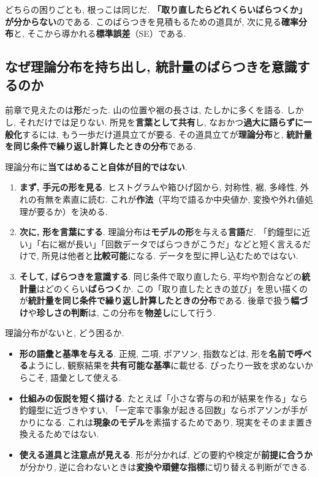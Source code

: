     どちらの困りごとも, 根っこは同じだ.
    \textbf{「取り直したらどれくらいばらつくか」が分からない}のである.
    このばらつきを見積もるための道具が, 次に見る\textbf{確率分布}と, そこから導かれる\textbf{標準誤差}（SE）である.

  \subsection{なぜ理論分布を持ち出し, 統計量のばらつきを意識するのか}
    前章で見えたのは\textbf{形}だった.
    山の位置や裾の長さは, たしかに多くを語る.
    しかし, それだけでは足りない.
    所見を\textbf{言葉として共有}し, なおかつ\textbf{過大に語らずに一般化}するには, もう一歩だけ道具立てが要る.
    その道具立てが\textbf{理論分布}と, \textbf{統計量を同じ条件で繰り返し計算したときの分布}である.

    理論分布に\textbf{当てはめること自体が目的ではない}.
    \begin{enumerate}
      \item \textbf{まず, 手元の形を見る}. ヒストグラムや箱ひげ図から, 対称性, 裾, 多峰性, 外れの有無を素直に読む. これが\textbf{作法}（平均で語るか中央値か, 変換や外れ値処理が要るか）を決める.
      \item \textbf{次に, 形を言葉にする}. 理論分布は\textbf{モデルの形}を与える\textbf{言語}だ.
            「釣鐘型に近い」「右に裾が長い」「回数データでばらつきがこうだ」などと短く言えるだけで, 所見は他者と\textbf{比較可能}になる.
            データを型に押し込むためではない.
      \item \textbf{そして, ばらつきを意識する}. 同じ条件で取り直したら, 平均や割合などの\textbf{統計量}はどのくらい\textbf{ばらつく}か.
            この「取り直したときの並び」を思い描くのが\textbf{統計量を同じ条件で繰り返し計算したときの分布}である.
            後章で扱う\textbf{幅づけ}や\textbf{珍しさの判断}は, この分布を\textbf{物差し}にして行う.
    \end{enumerate}

    理論分布がないと, どう困るか.
    \begin{itemize}
      \item \textbf{形の語彙と基準を与える}. 正規, 二項, ポアソン, 指数などは, 形を\textbf{名前で呼べる}ようにし, 観察結果を\textbf{共有可能な基準}に載せる. ぴったり一致を求めないからこそ, 語彙として使える.
      \item \textbf{仕組みの仮説を短く描ける}. たとえば「小さな寄与の和が結果を作る」なら釣鐘型に近づきやすい, 「一定率で事象が起きる回数」ならポアソンが手がかりになる.
            これは\textbf{現象のモデル}を素描するためであり, 現実をそのまま置き換えるためではない.
      \item \textbf{使える道具と注意点が見える}. 形が分かれば, どの要約や検定が\textbf{前提に合うか}が分かり, 逆に合わないときは\textbf{変換や頑健な指標}に切り替える判断ができる.
    \end{itemize}

